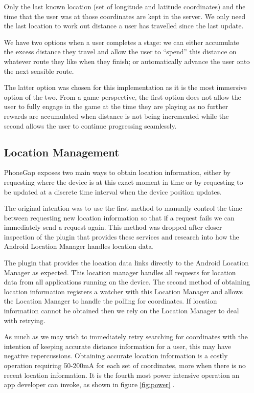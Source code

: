 Only the last known location (set of longitude and latitude
coordinates) and the time that the user was at those coordinates are
kept in the server. We only need the last location 
to work out distance a user has travelled since the last update. 

We have two options when a user completes a stage: we can either
accumulate the excess distance they travel and allow the user to
``spend'' this distance on whatever route they like when they finish;
or automatically advance the user onto the next sensible route. 

The latter option was chosen for this implementation as it is the most
immersive option of the two. From a game perspective, the first option
does not allow the user to fully engage in the game at the time they
are playing as no further rewards are accumulated when distance is not
being incremented while the second allows the user to continue
progressing seamlessly. 

\subsection{Location Management}
\label{sec:location_mgmt}
PhoneGap exposes two main ways to obtain location information, either
by requesting where the device is at this exact moment in
time\cite{phonegap_currentpos} or by requesting to be updated at a
discrete time interval when the device position
updates\cite{phonegap_watchpos}. 

The original intention was to use the first method to manually control
the time between requesting new location information so that if a
request fails we can immediately send a request again. This method was
dropped after closer inspection of the plugin that provides these
services and research into how the Android Location Manager handles
location data.

The plugin that provides the location data links directly to the
Android Location Manager as expected. This location manager handles
all requests for location data from all applications running on the
device. The second method of obtaining location information registers
a watcher with this Location Manager and allows the Location Manager
to handle the polling for coordinates. If location information cannot
be obtained then we rely on the Location Manager to deal with
retrying. 

As much as we may wish to immediately retry searching for coordinates
with the intention of keeping accurate distance information for a
user, this may have negative repercussions. Obtaining accurate
location information is a costly operation requiring 50-200mA for each set
of coordinates, more when there is no recent location
information\cite{android_power}. It is the fourth most power intensive
operation an app developer can invoke, as shown in figure
\ref{fig:power} \cite{android_efficiencySlides}.


